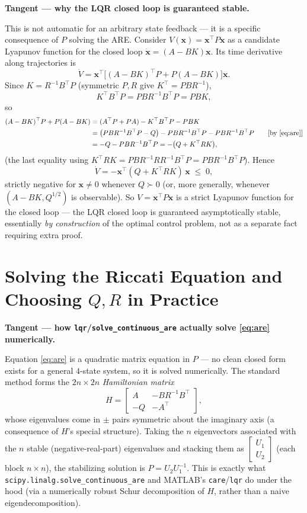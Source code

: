 \documentclass[11pt]{article}
\newenvironment{tangent}[1]{%
  \par\smallskip\noindent\hrulefill\par
  \noindent\textbf{Tangent — #1.}\par\smallskip
  \begingroup\itshape
}{%
  \endgroup
  \par\noindent\hrulefill\par\smallskip
}
\newcommand{\mb}[1]{\mathbf{#1}}
\begin{document}
\begin{tangent}{why the LQR closed loop is guaranteed stable}
This is not automatic for an arbitrary state feedback — it is a specific
consequence of $P$ solving the ARE. Consider $V(\mb x)=\mb x^\top P\mb x$
as a candidate Lyapunov function for the closed loop $\dot{\mb x} =
(A-BK)\mb x$. Its time derivative along trajectories is
\[
  \dot V = \mb x^\top\big[(A-BK)^\top P + P(A-BK)\big]\mb x.
\]
Since $K=R^{-1}B^\top P$ (symmetric $P,R$ give $K^\top = PBR^{-1}$),
\[
  K^\top B^\top P = PBR^{-1}B^\top P = PBK,
\]
so
\begin{align*}
  (A-BK)^\top P + P(A-BK)
  &= (A^\top P+PA) - K^\top B^\top P - PBK\\
  &= \big(PBR^{-1}B^\top P - Q\big) - PBR^{-1}B^\top P - PBR^{-1}B^\top P
  \qquad\text{[by \eqref{eq:are}]}\\
  &= -Q - PBR^{-1}B^\top P = -\big(Q + K^\top RK\big),
\end{align*}
(the last equality using $K^\top RK = PBR^{-1}RR^{-1}B^\top P =
PBR^{-1}B^\top P$). Hence
\begin{equation}
  \dot V = -\mb x^\top(Q+K^\top RK)\,\mb x \;\le\; 0, \label{eq:lyap}
\end{equation}
strictly negative for $\mb x\ne0$ whenever $Q\succ0$ (or, more generally,
whenever $(A-BK,Q^{1/2})$ is observable). So $V=\mb x^\top P\mb x$ is a
strict Lyapunov function for the closed loop — the LQR closed loop is
guaranteed asymptotically stable, essentially \emph{by construction} of
the optimal control problem, not as a separate fact requiring extra proof.
\end{tangent}

\section{Solving the Riccati Equation and Choosing $Q,R$ in Practice}

\begin{tangent}{how \texttt{lqr}/\texttt{solve\_continuous\_are} actually
solve \eqref{eq:are} numerically}
Equation \eqref{eq:are} is a quadratic matrix equation in $P$ — no clean
closed form exists for a general $4$-state system, so it is solved
numerically. The standard method forms the $2n\times2n$ \emph{Hamiltonian
matrix}
\[
  H = \begin{bmatrix} A & -BR^{-1}B^\top \\ -Q & -A^\top \end{bmatrix},
\]
whose eigenvalues come in $\pm$ pairs symmetric about the imaginary axis
(a consequence of $H$'s special structure). Taking the $n$ eigenvectors
associated with the $n$ stable (negative-real-part) eigenvalues and
stacking them as $\begin{bmatrix}U_1\\U_2\end{bmatrix}$ (each block
$n\times n$), the stabilizing solution is $P = U_2 U_1^{-1}$. This is
exactly what \texttt{scipy.linalg.solve\_continuous\_are} and MATLAB's
\texttt{care}/\texttt{lqr} do under the hood (via a numerically robust
Schur decomposition of $H$, rather than a naive eigendecomposition).
\end{tangent}
\end{document}
